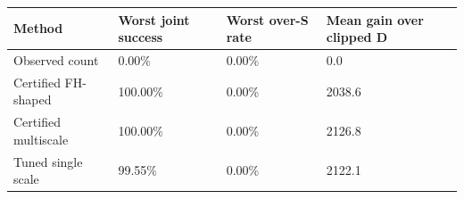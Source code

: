 \begin{tabular}{llll}
\toprule
Method & Worst joint success & Worst over-S rate & Mean gain over clipped D \\
\midrule
Observed count & 0.00\% & 0.00\% & 0.0 \\
Certified FH-shaped & 100.00\% & 0.00\% & 2038.6 \\
Certified multiscale & 100.00\% & 0.00\% & 2126.8 \\
Tuned single scale & 99.55\% & 0.00\% & 2122.1 \\
\bottomrule
\end{tabular}
